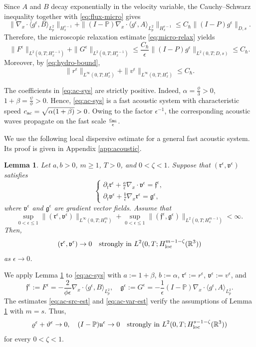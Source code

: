 \documentclass[10pt,reqno]{amsart}
\numberwithin{equation}{section}
\newtheorem{lemma}{Lemma}[section]
\newcommand{\lt}{\left}
\newcommand{\rt}{\right}
\newcommand{\lal}{\langle}
\newcommand{\ral}{\rangle}
\newcommand{\mP}{\mathbb{P}}
\newcommand{\vrh}{\varrho}
\newcommand{\vth}{\vartheta}
\newcommand{\mfu}{\mathfrak{u}}
\newcommand{\R}{\mathbb R}
\newcommand{\bq}{\begin{equation}}
\newcommand{\eq}{\end{equation}}
\newcommand{\pa}{\partial}
\begin{document}
 
Since $A$ and $B$ decay exponentially in the velocity variable, the Cauchy--Schwarz inequality together with \eqref{eq:flux-micro} gives
\[
\| \nabla_x\cdot \lal g^\epsilon, B \ral_{L^2_p} \|_{H^{s-1}_x} + \| (I-\mP) \nabla_x\cdot \lal g^\epsilon, A \ral_{L^2_p} \|_{H^{s-1}_x} \le C_\hbar \| (I-P)g^\epsilon \|_{D,s}.
\]
Therefore, the microscopic relaxation estimate \eqref{eq:micro-relax} yields
\bq \label{eq:ac-src-est}
\| F^\epsilon \|_{L^2(0,T;H^{s-1}_x)} + \| G^\epsilon \|_{L^2(0,T;H^{s-1}_x)} \le \frac{C_\hbar}{\epsilon} \| (I-P)g^\epsilon \|_{L^2(0,T;D,s)}  \le C_\hbar.
\eq
Moreover, by \eqref{eq:hydro-bound},
\bq \label{eq:ac-var-est}
\| r^\epsilon \|_{L^\infty(0,T;H^s_x)} + \| v^\epsilon \|_{L^\infty(0,T;H^s_x)} \le C_\hbar.
\eq

The coefficients in \eqref{eq:ac-sys} are strictly positive. Indeed, $\alpha = \frac{\phi}{3} > 0$, $1+\beta = \frac{\psi}{\phi} > 0$. Hence, \eqref{eq:ac-sys} is a fast acoustic system with characteristic speed $c_{\rm ac} = \sqrt{ \alpha (1+\beta) } > 0$.  Owing to the factor $\epsilon^{-1}$, the corresponding acoustic waves propagate on the fast scale $\frac{c_{\rm ac}}\epsilon$.

We use the following local dispersive estimate for a general fast acoustic system. Its proof is given in Appendix \ref{app:acoustic}.

\begin{lemma}\label{lem:abs-disp}
Let $a,b>0$, $m\ge1$, $T>0$, and $0<\zeta<1$. Suppose that
$(\mathfrak r^\epsilon,\mathfrak v^\epsilon)$ satisfies
\bq\label{eq:abs-ac}
\begin{cases}
\displaystyle \pa_t\mathfrak r^\epsilon + \frac{a}{\epsilon} \nabla_x\cdot\mathfrak v^\epsilon = \mathfrak f^\epsilon, \\[2mm]
\displaystyle \pa_t\mathfrak v^\epsilon + \frac{b}{\epsilon} \nabla_x\mathfrak r^\epsilon = \mathfrak g^\epsilon,
\end{cases}
\eq
where $\mathfrak v^\epsilon$ and $\mathfrak g^\epsilon$ are gradient vector fields. Assume that
\[
\sup_{0<\epsilon\le1} \| \lt( \mathfrak r^\epsilon, \mathfrak v^\epsilon \rt) \|_{L^\infty(0,T;H^m_x)} + \sup_{0<\epsilon\le1} \| \lt( \mathfrak f^\epsilon, \mathfrak g^\epsilon \rt) \|_{L^2(0,T;H^{m-1}_x)} < \infty.
\]
Then,
\bq \label{eq:abs-zero}
\lt( \mathfrak r^\epsilon, \mathfrak v^\epsilon \rt) \to 0 \quad \text{strongly in } L^2( 0,T; H^{m-1-\zeta}_{\rm loc}(\R^3))
\eq
as $\epsilon\to0$.
\end{lemma}

We apply Lemma \ref{lem:abs-disp} to \eqref{eq:ac-sys} with $a := 1+\beta$, $b := \alpha$, $\mathfrak r^\epsilon := r^\epsilon$, $\mathfrak v^\epsilon := v^\epsilon$, and
\[
\mathfrak f^\epsilon := F^\epsilon = -\frac{2}{\phi\epsilon} \nabla_x\cdot \lal g^\epsilon, B \ral_{L^2_p},
\quad
\mathfrak g^\epsilon := G^\epsilon = -\frac{1}{\epsilon} (I-\mP) \nabla_x\cdot \lal g^\epsilon, A \ral_{L^2_p}.
\]
The estimates \eqref{eq:ac-src-est} and \eqref{eq:ac-var-est} verify the assumptions of Lemma \ref{lem:abs-disp} with $m=s$. Thus,
\bq\label{eq:ac-strong}
\vrh^\epsilon + \vth^\epsilon \to 0, \quad (I-\mP) \mfu^\epsilon \to 0 \quad \text{strongly in } L^2( 0,T; H^{s-1-\zeta}_{\rm loc}(\R^3))
\eq
for every $0<\zeta<1$.
\end{document}
